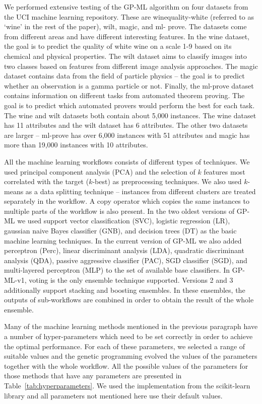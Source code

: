 \documentclass{ws-ijait}
\begin{document}
We performed extensive testing of the GP-ML algorithm on four datasets from the
UCI machine learning repository\cite{Lichman:2013}. These are 
winequality-white\cite{Cortez2009547} (referred to as `wine' in the rest of the paper),
wilt\cite{Johnson:2013:HPA:2512892.2512894}, magic\cite{Bock2004511},  and ml-
prove\cite{Bridge}. The datasets come from different areas and have  different
interesting features. In the wine dataset, the goal is to predict  the quality
of white wine on a scale 1-9 based on its chemical and physical  properties. The
wilt dataset aims to classify images into two classes based on features from
different image analysis approaches. The magic dataset contains  data from the
field of particle physics -- the goal is to predict whether an observation is a
gamma particle or not. Finally, the ml-prove dataset contains information on
different tasks from automated theorem proving. The goal is to  predict which
automated provers would perform the best for each task. The wine and wilt
datasets both contain about 5,000 instances. The wine dataset has 11 attributes
and the wilt dataset has 6 attributes. The other two datasets are larger -- 
ml-prove has over 6,000 instances with 51 attributes and magic has more than 
19,000 instances with 10 attributes.

All the machine learning workflows consists of different types of techniques. We
used principal component analysis (PCA) and the selection of $k$ features most
correlated with the target ($k$-best) as preprocessing techniques. We also used
$k$-means as a data splitting technique -- instances from different clusters are
treated separately in the workflow. A copy operator which copies the same
instances to multiple parts of the workflow is also present. In the two oldest
versions of GP-ML we used support vector classification (SVC), logistic
regression (LR), gaussian naive Bayes classifier (GNB), and decision trees (DT)
as the basic machine learning techniques. In the current version of GP-ML we
also added perceptron (Perc), linear discriminant analysis (LDA), quadratic
discriminant analysis (QDA), passive aggressive classifier (PAC), SGD classifier
(SGD), and multi-layered perceptron (MLP) to the set of available base
classifiers. In GP-ML-v1, voting is the only ensemble technique supported.
Versions 2 and 3 additionally support stacking and boosting ensembles. In these
ensembles, the outputs of sub-workflows are combined in order to obtain the 
result of the whole ensemble.

Many of the machine learning methods mentioned in the previous paragraph have a
number of hyper-parameters which need to be set correctly in order to achieve
the optimal performance. For each of these parameters, we selected a range of
suitable values and the genetic programming evolved the values of the parameters
together with the whole workflow. All the possible values of the parameters for
those methods that have any parameters are presented in
Table~\ref{tab:hyperparameters}. We used the implementation from the scikit-learn 
library and all parameters not mentioned here use their default values.
\end{document}
